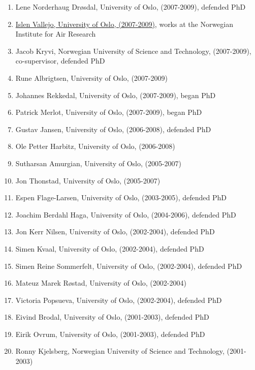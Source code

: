 \documentclass[aps,floatfix,preprint]{revtex4-1}
\begin{document}
\begin{enumerate}
\item Lene Norderhaug Drøsdal, University of Oslo, (2007-2009), defended PhD

\item \href{{https://www.nilu.no/OmNILU/Kontaktoss/Ansatte/tabid/70/ctl/EmployeeDetails/mid/972/employeeid/5822/tabmoduleid/2333/language/en-GB/Default.aspx}}{Islen Vallejo, University of Oslo, (2007-2009)}, works at the Norwegian Institute for Air Research

\item Jacob Kryvi, Norwegian University of Science and Technology, (2007-2009), co-supervisor, defended PhD

\item Rune Albrigtsen, University of Oslo, (2007-2009)

\item Johannes Rekkedal, University of Oslo, (2007-2009), began PhD

\item Patrick Merlot, University of Oslo, (2007-2009), began PhD

\item Gustav Jansen, University of Oslo, (2006-2008), defended PhD

\item Ole Petter Harbitz, University of Oslo, (2006-2008)

\item Sutharsan Amurgian, University of Oslo, (2005-2007)

\item Jon Thonstad, University of Oslo, (2005-2007)

\item Espen Flage-Larsen, University of Oslo, (2003-2005), defended PhD

\item Joachim Berdahl Haga, University of Oslo, (2004-2006), defended PhD

\item Jon Kerr Nilsen, University of Oslo, (2002-2004), defended PhD

\item Simen Kvaal, University of Oslo, (2002-2004), defended PhD

\item Simen Reine Sommerfelt, University of Oslo, (2002-2004), defended PhD

\item Mateuz Marek Røstad, University of Oslo, (2002-2004)

\item Victoria Popsueva, University of Oslo, (2002-2004), defended PhD

\item Eivind Brodal, University of Oslo, (2001-2003), defended PhD

\item Eirik Ovrum, University of Oslo, (2001-2003), defended PhD

\item Ronny Kjelsberg, Norwegian University of Science and Technology, (2001-2003)
\end{enumerate}
\end{document}

